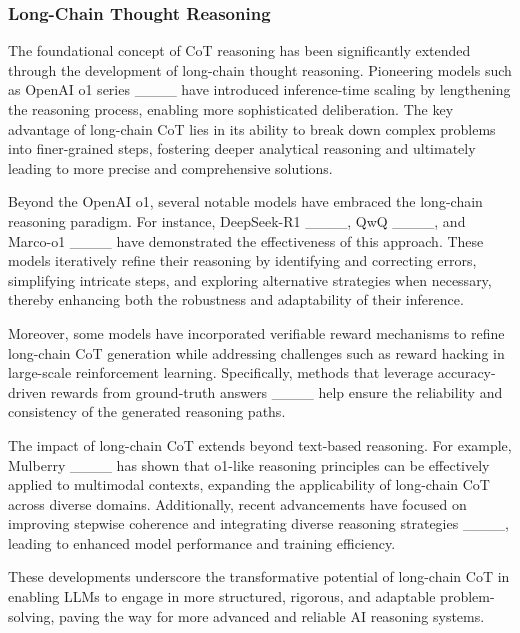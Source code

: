 \subsubsection{Long-Chain Thought Reasoning}
The foundational concept of CoT reasoning has been significantly extended through the development of long-chain thought reasoning. Pioneering models such as OpenAI o1 series ____ have introduced inference-time scaling by lengthening the reasoning process, enabling more sophisticated deliberation. The key advantage of long-chain CoT lies in its ability to break down complex problems into finer-grained steps, fostering deeper analytical reasoning and ultimately leading to more precise and comprehensive solutions.

Beyond the OpenAI o1, several notable models have embraced the long-chain reasoning paradigm. For instance, DeepSeek-R1 ____, QwQ ____, and Marco-o1 ____ have demonstrated the effectiveness of this approach. These models iteratively refine their reasoning by identifying and correcting errors, simplifying intricate steps, and exploring alternative strategies when necessary, thereby enhancing both the robustness and adaptability of their inference.

Moreover, some models have incorporated verifiable reward mechanisms to refine long-chain CoT generation while addressing challenges such as reward hacking in large-scale reinforcement learning. Specifically, methods that leverage accuracy-driven rewards from ground-truth answers ____ help ensure the reliability and consistency of the generated reasoning paths.


The impact of long-chain CoT extends beyond text-based reasoning. For example, Mulberry ____ has shown that o1-like reasoning principles can be effectively applied to multimodal contexts, expanding the applicability of long-chain CoT across diverse domains. Additionally, recent advancements have focused on improving stepwise coherence and integrating diverse reasoning strategies ____, leading to enhanced model performance and training efficiency.

These developments underscore the transformative potential of long-chain CoT in enabling LLMs to engage in more structured, rigorous, and adaptable problem-solving, paving the way for more advanced and reliable AI reasoning systems.